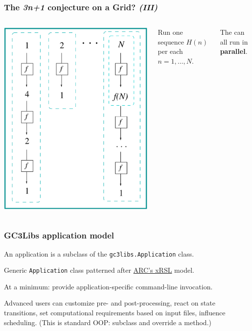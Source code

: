 \documentclass[presentation]{beamer}
\newcommand{\largeskip}{\vspace{1em}}
\def\+{\largeskip}
\begin{document}
  \begin{frame}
    \frametitle{The \emph{3n+1} conjecture on a Grid? \emph{(III)}}
    \label{sec:7c}

    \+
    \begin{columns}[c]
      \includegraphics[height=0.8\textheight]{3n+1_P}
      
      Run one sequence $H(n)$ per each $n = 1, \ldots, N$.

      \+
      The can all run in \textbf{parallel}.
    \end{columns}
  \end{frame}

  \begin{frame}
    \frametitle{GC3Libs application model}
    \label{sec:9}

    An application is a subclass of the \texttt{gc3libs.Application} class.

    Generic \texttt{Application} class patterned after \href{http://www.nordugrid.org/documents/xrsl.pdf}{ARC's xRSL} model.

    At a minimum: provide application-specific command-line invocation.

    Advanced users can customize pre- and post-processing, react on
    state transitions, set computational requirements based on input
    files, influence scheduling.  (This is standard OOP: subclass and
    override a method.)
\end{frame}
\end{document}
